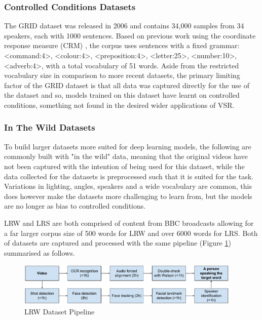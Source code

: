 \subsubsection{Controlled Conditions Datasets}
The GRID dataset was released in 2006 \cite{Cooke2006} and contains 34,000 samples from 34 speakers, each with 1000 sentences.
Based on previous work using the coordinate response measure (CRM) \cite{Bolia2000}, the corpus uses sentences with a fixed grammar: <command:4>, <colour:4>, <preposition:4>, <letter:25>, <number:10>, <adverb:4>, with a total vocabulary of 51 words.
Aside from the restricted vocabulary size in comparison to more recent datasets, the primary limiting factor of the GRID dataset is that all data was captured directly for the use of the dataset and so, models trained on this dataset have learnt on controlled conditions, something not found in the desired wider applications of VSR.

\subsubsection{In The Wild Datasets}
To build larger datasets more suited for deep learning models, the following are commonly built with "in the wild" data, meaning that the original videos have not been captured with the intention of being used for this dataset, while the data collected for the datasets is preprocessed such that it is suited for the task.
Variations in lighting, angles, speakers and a wide vocabulary are common, this does however make the datasets more challenging to learn from, but the models are no longer as bias to controlled conditions.

LRW and LRS are both comprised of content from BBC broadcasts \cite{Chung2016, Chung2017} allowing for a far larger corpus size of 500 words for LRW and over 6000 words for LRS.
Both of datasets are captured and processed with the same pipeline (Figure \ref{fig:LRW_Pipeline}) summarised as follows. 

\begin{figure}[h]
    \centering
        \includegraphics[width=0.95\textwidth]{figures/lrw_pipeline.png}
    \caption{LRW Dataset Pipeline \cite{Chung2016}}\label{fig:LRW_Pipeline}
\end{figure}

